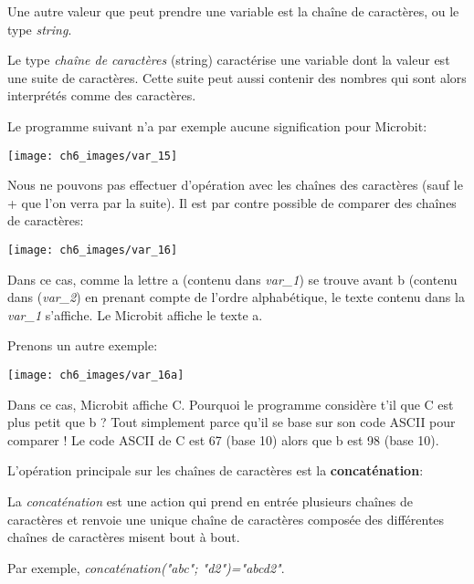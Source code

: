 \documentclass[11pt, a4paper]{book}
\begin{document}
Une autre valeur que peut prendre une variable est la chaîne de caractères, ou le type {\it string}.

\begin{defi}
Le type {\it chaîne de caractères} (string) caractérise une variable dont la valeur est une suite de caractères. Cette suite peut aussi contenir des nombres qui sont alors interprétés comme des caractères.
\end{defi}

Le programme suivant n'a par exemple aucune signification pour Microbit:

\begin{center}
\texttt{[image: ch6\_images/var\_15]}
\end{center}

Nous ne pouvons pas effectuer d'opération avec les chaînes des caractères (sauf le + que l'on verra par la suite). Il est par contre possible de comparer des chaînes de caractères:

\begin{center}
\texttt{[image: ch6\_images/var\_16]}
\end{center}
Dans ce cas, comme la lettre a (contenu dans {\it var\_1}) se trouve avant b (contenu dans ({\it var\_2}) en prenant compte de l'ordre alphabétique, le texte contenu dans la {\it var\_1} s'affiche. Le Microbit affiche le texte a.

Prenons un autre exemple:
\begin{center}
\texttt{[image: ch6\_images/var\_16a]}
\end{center}
Dans ce cas, Microbit affiche C. Pourquoi le programme considère t'il que C est plus petit que b ? Tout simplement parce qu'il se base sur son code ASCII pour comparer ! Le code ASCII de C est 67 (base 10) alors que b est 98 (base 10).

\newline

L'opération principale sur les chaînes de caractères est la {\bf concaténation}:

\begin{defi}
La {\it concaténation} est une action qui prend en entrée plusieurs chaînes de caractères et renvoie une unique chaîne de caractères composée des différentes chaînes de caractères misent bout à bout.
\end{defi}

Par exemple, {\it concaténation("abc"; "d2")="abcd2"}.

\ 
\end{document}
